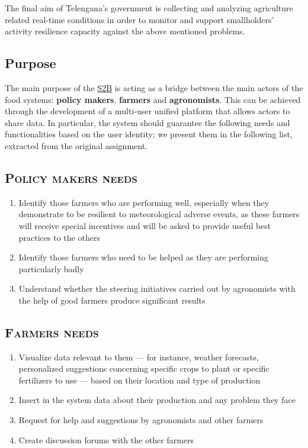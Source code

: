 The final aim of Telengana's government is collecting and analyzing agriculture related real-time conditions in order to monitor and support smallholders' activity resilience capacity against the above mentioned problems.

\subsection{Purpose}
\label{sec:purpose}
The main purpose of the \hyperref[tab:acronymsTable]{S2B} is acting as a bridge between the main actors of the food systems: \textbf{policy makers}, \textbf{farmers} and \textbf{agronomists}. This can be achieved through the development of a multi-user unified platform that allows actors to share data. In particular, the system should guarantee the following needs and functionalities based on the user identity; we present them in the following list, extracted from the original assignment.

\subsection*{\textsc{\textcolor{myblue}{Policy makers needs}}}
\label{sec:policyMakersNeeds}
    \begin{enumerate}
        \item \label{itm:first} Identify those farmers who are performing well, especially when they demonstrate to be resilient to meteorological adverse events, as these farmers will receive special incentives and will be asked to provide useful best practices to the others
        \item \label{itm:badly_performing_farmers} Identify those farmers who need to be helped as they are performing particularly badly
        \item Understand whether the steering initiatives carried out by agronomists with the help of good farmers produce significant results
    \end{enumerate}
\subsection*{\textsc{\textcolor{myblue}{Farmers needs}}}
\label{sec:farmersNeeds}
    \begin{enumerate}[resume]
        \item \label{itm:data_relevant_to_farmers} Visualize data relevant to them –-- for instance, weather forecasts, personalized suggestions concerning specific crops to plant or specific fertilizers to use --– based on their location and type of production
        \item Insert in the system data about their production and any problem they face
        \item Request for help and suggestions by agronomists and other farmers
        \item Create discussion forums with the other farmers
    \end{enumerate}
